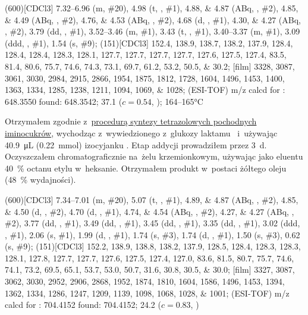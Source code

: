 \begin{fullexp}
	\NMR(600)[CDCl3] \numrange{7.32}{6.96} (m, \#{20}), \num{4.98} (t, , \#{1}), \numlist{4.88;4.87} (ABq, , \#{2}), \numlist{4.85;4.49} (ABq, , \#{2}), \numlist{4.76;4.53} (ABq, , \#{2}), \num{4.68} (d, , \#{1}), \numlist{4.30;4.27} (ABq, , \#{2}), \num{3.79} (dd, , \#{1}), \numrange{3.52}{3.46} (m, \#{1}), \num{3.43} (t, , \#{1}), \numrange{3.40}{3.37} (m, \#{1}), \num{3.09} (ddd, , \#{1}), \num{1.54} (s, \#{9});
	(151)[CDCl3] \numlist{152.4; 138.9; 138.7; 138.2; 137.9; 128.4; 128.4; 128.4; 128.3; 128.1; 127.7; 127.7; 127.7; 127.7; 127.6; 127.5; 127.4; 83.5; 81.4; 80.6; 75.7; 74.6; 74.3; 73.1; 69.7; 61.2; 53.2; 50.5; 30.2};
	[film] \numlist{3328; 3087; 3061; 3030; 2984; 2915; 2866; 1954; 1875; 1812; 1728; 1604; 1496; 1453; 1400; 1363; 1334; 1285; 1238; 1211; 1094; 1069; 1028};
	 (ESI-TOF) m/z calcd for : \num{648.3550} found: \num{648.3542};
	\data{[$\alpha^{23}_D$]~$=$} \num{37.1} ($c = 0.54$, );
	 \numrange{164}{165}\si{\celsius}
\end{fullexp}

Otrzymałem zgodnie z~\hyperref[experimental:sugars:schwartz]{procedurą syntezy tetrazolowych
	pochodnych iminocukrów}, wychodząc z~wywiedzionego z~glukozy laktamu~
	i~używając \SI{40.9}{\micro\liter} (\SI{0.22}{\milli\mol}) izocyjanku .
Etap addycji prowadziłem przez \SI{3}{\day}.
Oczyszczałem chromatograficznie na~żelu krzemionkowym,
	używając jako eluentu \SI{40}{\percent} octanu etylu w~heksanie.
Otrzymałem produkt w~postaci żółtego oleju (\SI{48}{\percent} wydajności).

\begin{fullexp}
	\NMR(600)[CDCl3] \numrange{7.34}{7.01} (m, \#{20}), \num{5.07} (t, , \#{1}), \numlist{4.89;4.87} (ABq, , \#{2}), \numlist{4.85;4.50} (d, , \#{2}), \num{4.70} (d, , \#{1}), \numlist{4.74;4.54} (ABq, , \#{2}), \numlist{4.27;4.27} (ABq, , \#{2}), \num{3.77} (dd, , \#{1}), \num{3.49} (dd, , \#{1}), \num{3.45} (dd, , \#{1}), \num{3.35} (dd, , \#{1}), \num{3.02} (ddd, , \#{1}), \num{2.06} (s, \#{1}), \num{1.99} (d, , \#{1}), \num{1.74} (s, \#{3}), \num{1.74} (d, , \#{1}), \num{1.50} (s, \#{3}), \num{0.62} (s, \#{9});
	(151)[CDCl3] \numlist{152.2; 138.9; 138.8; 138.2; 137.9; 128.5; 128.4; 128.3; 128.3; 128.1; 127.8; 127.7; 127.7; 127.6; 127.5; 127.4; 127.0; 83.6; 81.5; 80.7; 75.7; 74.6; 74.1; 73.2; 69.5; 65.1; 53.7; 53.0; 50.7; 31.6; 30.8; 30.5; 30.0};
	[film] \numlist{3327; 3087; 3062; 3030; 2952; 2906; 2868; 1952; 1874; 1810; 1604; 1586; 1496; 1453; 1394; 1362; 1334; 1286; 1247; 1209; 1139; 1098; 1068; 1028; 1001};
	 (ESI-TOF) m/z calcd for : \num{704.4152} found: \num{704.4152};
	\data{[$\alpha^{23}_D$]~$=$} \num{24.2} ($c = 0.83$, )
\end{fullexp}

